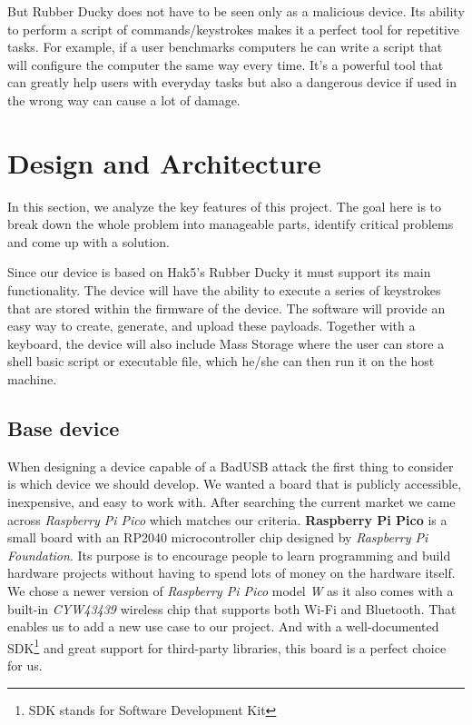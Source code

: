 But Rubber Ducky does not have to be seen only as a malicious device. Its ability to perform a script of commands/keystrokes makes it a perfect tool for repetitive tasks. For example, if a user benchmarks computers he can write a script that will configure the computer the same way every time. It's a powerful tool that can greatly help users with everyday tasks but also a dangerous device if used in the wrong way can cause a lot of damage. 


\chapter{Design and Architecture}
\label{designAndArchitecture}
In this section, we analyze the key features of this project. The goal here is to break down the whole problem into manageable parts, identify critical problems and come up with a solution. 

Since our device is based on Hak5's Rubber Ducky it must support its main functionality. The device will have the ability to execute a series of keystrokes that are stored within the firmware of the device. The software will provide an easy way to create, generate, and upload these payloads. Together with a keyboard, the device will also include Mass Storage where the user can store a shell basic script or executable file, which he/she can then run it on the host machine.

\section{Base device}
When designing a device capable of a BadUSB attack the first thing to consider is which device we should develop. We wanted a board that is publicly accessible, inexpensive, and easy to work with. After searching the current market we came across \emph{Raspberry Pi Pico} which matches our criteria. \textbf{Raspberry Pi Pico} is a small board with an RP2040 microcontroller chip designed by \emph{Raspberry Pi Foundation}. Its purpose is to encourage people to learn programming and build hardware projects without having to spend lots of money on the hardware itself. We chose a newer version of \emph{Raspberry Pi Pico} model \emph{W} as it also comes with a built-in \emph{CYW43439} wireless chip that supports both Wi-Fi and Bluetooth. That enables us to add a new use case to our project. And with a well-documented SDK\footnote{SDK stands for Software Development Kit} and great support for third-party libraries, this board is a perfect choice for us. 

